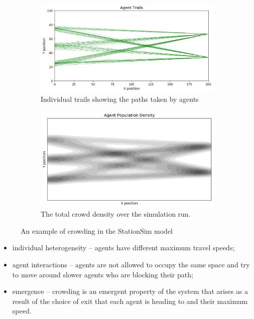 \begin{figure}
    \centering
    \begin{subfigure}[b]{0.48\textwidth}
        \centering
        \includegraphics[width=.95\linewidth]{figures/crowding-trails}
        \caption{Individual trails showing the paths taken by agents}
        \label{fig:crowding-trails}
    \end{subfigure}
    \label{fig:crowding}
    \begin{subfigure}[b]{0.48\textwidth}
        \centering
        \includegraphics[width=.95\linewidth]{figures/crowding-density}
        \caption{The total crowd density over the simulation run.}
        \label{fig:crowding-density}
    \end{subfigure}
    \caption{An example of crowding in the StationSim model}
    \label{fig:crowding}
\end{figure}

\begin{itemize}
	\item individual heterogeneity -- agents have different maximum travel speeds; 
	\item agent interactions -- agents are not allowed to occupy the same space and try to move around slower agents who are blocking their path; 
	\item emergence -- crowding is an emergent property of the system that arises as a result of the choice of exit that each agent is heading to and their maximum speed.
\end{itemize}

